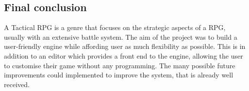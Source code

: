 \subsection{Final conclusion}
A Tactical RPG is a genre that focuses on the strategic aspects of a RPG, usually with an extensive battle system.  The aim of the project was to build a user-friendly engine while affording user as much flexibility as possible. This is in addition to an editor which provides a front end to the engine, allowing the user to customise their game without any programming.  The many possible future improvements could implemented to improve the system, that is already well received. 